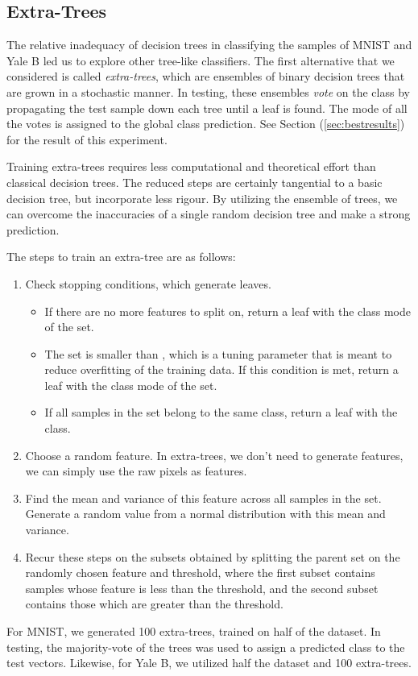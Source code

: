 \pagebreak
\subsection{Extra-Trees}

The relative inadequacy of decision trees in classifying the samples of MNIST and Yale B led us to explore other tree-like classifiers. The first alternative that we considered is called \emph{extra-trees}, which are ensembles of binary decision trees that are grown in a stochastic manner. In testing, these ensembles \emph{vote} on the class by propagating the test sample down each tree until a leaf is found. The mode of all the votes is assigned to the global class prediction. See Section (\ref{sec:bestresults}) for the result of this experiment. 

Training extra-trees requires less computational and theoretical effort than classical decision trees. The reduced steps are certainly tangential to a basic decision tree, but incorporate less rigour. By utilizing the ensemble of trees, we can overcome the inaccuracies of a single random decision tree and make a strong prediction. 

The steps to train an extra-tree are as follows:
%
\begin{enumerate}
\item Check stopping conditions, which generate leaves.
%
  \begin{itemize}
  \item If there are no more features to split on, return a leaf with the class mode of the set. 
  \item The set is smaller than , which is a tuning parameter that is meant to reduce overfitting of the training data. If this condition is met, return a leaf with the class mode of the set.
  \item If all samples in the set belong to the same class, return a leaf with the class.
  \end{itemize}
\item Choose a random feature. In extra-trees, we don't need to generate features, we can simply use the raw pixels as features. 
\item Find the mean and variance of this feature across all samples in the set. Generate a random value from a normal distribution with this mean and variance. 
\item Recur these steps on the subsets obtained by splitting the parent set on the randomly chosen feature and threshold, where the first subset contains samples whose feature is less than the threshold, and the second subset contains those which are greater than the threshold.
\end{enumerate}

For MNIST, we generated 100 extra-trees, trained on half of the dataset. In testing, the majority-vote of the trees was used to assign a predicted class to the test vectors. Likewise, for Yale B, we utilized half the dataset and 100 extra-trees.
